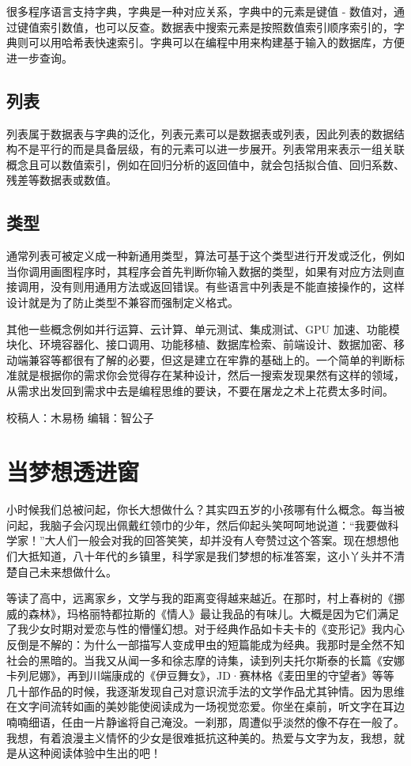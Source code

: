 \documentclass[
]{book}
\begin{document}
很多程序语言支持字典，字典是一种对应关系，字典中的元素是键值 - 数值对，通过键值索引数值，也可以反查。数据表中搜索元素是按照数值索引顺序索引的，字典则可以用哈希表快速索引。字典可以在编程中用来构建基于输入的数据库，方便进一步查询。

\hypertarget{ux5217ux8868}{%
\subsection{列表}\label{ux5217ux8868}}

列表属于数据表与字典的泛化，列表元素可以是数据表或列表，因此列表的数据结构不是平行的而是具备层级，有的元素可以进一步展开。列表常用来表示一组关联概念且可以数值索引，例如在回归分析的返回值中，就会包括拟合值、回归系数、残差等数据表或数值。

\hypertarget{ux7c7bux578b}{%
\subsection{类型}\label{ux7c7bux578b}}

通常列表可被定义成一种新通用类型，算法可基于这个类型进行开发或泛化，例如当你调用画图程序时，其程序会首先判断你输入数据的类型，如果有对应方法则直接调用，没有则用通用方法或返回错误。有些语言中列表是不能直接操作的，这样设计就是为了防止类型不兼容而强制定义格式。

其他一些概念例如并行运算、云计算、单元测试、集成测试、GPU 加速、功能模块化、环境容器化、接口调用、功能移植、数据库检索、前端设计、数据加密、移动端兼容等都很有了解的必要，但这是建立在牢靠的基础上的。一个简单的判断标准就是根据你的需求你会觉得存在某种设计，然后一搜索发现果然有这样的领域，从需求出发回到需求中去是编程思维的要诀，不要在屠龙之术上花费太多时间。

校稿人：木易杨
编辑：智公子

\hypertarget{ux5f53ux68a6ux60f3ux900fux8fdbux7a97}{%
\section{当梦想透进窗}\label{ux5f53ux68a6ux60f3ux900fux8fdbux7a97}}

小时候我们总被问起，你长大想做什么？其实四五岁的小孩哪有什么概念。每当被问起，我脑子会闪现出佩戴红领巾的少年，然后仰起头笑呵呵地说道：``我要做科学家！''大人们一般会对我的回答笑笑，却并没有人夸赞过这个答案。现在想想他们大抵知道，八十年代的乡镇里，科学家是我们梦想的标准答案，这小丫头并不清楚自己未来想做什么。

等读了高中，远离家乡，文学与我的距离变得越来越近。在那时，村上春树的《挪威的森林》，玛格丽特都拉斯的《情人》最让我品的有味儿。大概是因为它们满足了我少女时期对爱恋与性的懵懂幻想。对于经典作品如卡夫卡的《变形记》我内心反倒是不解的：为什么一部描写人变成甲虫的短篇能成为经典。我那时是全然不知社会的黑暗的。当我又从闻一多和徐志摩的诗集，读到列夫托尔斯泰的长篇《安娜卡列尼娜》，再到川端康成的《伊豆舞女》，JD·赛林格《麦田里的守望者》等等几十部作品的时候，我逐渐发现自己对意识流手法的文学作品尤其钟情。因为思维在文字间流转如画的美妙能使阅读成为一场视觉恋爱。你坐在桌前，听文字在耳边喃喃细语，任由一片静谧将自己淹没。一刹那，周遭似乎淡然的像不存在一般了。我想，有着浪漫主义情怀的少女是很难抵抗这种美的。热爱与文字为友，我想，就是从这种阅读体验中生出的吧！
\end{document}
